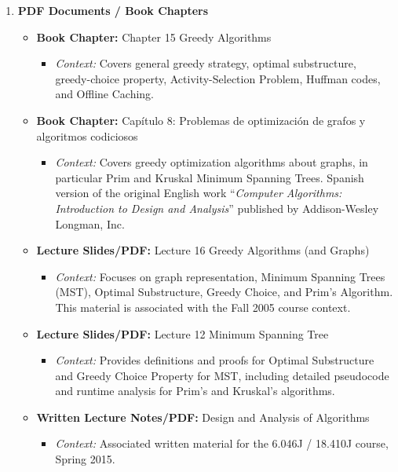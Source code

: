 \documentclass{article}
\begin{document}
\begin{enumerate}
    \item \textbf{PDF Documents / Book Chapters}
    \begin{itemize}
        \item \textbf{Book Chapter\cite{cormen2022algorithms}:} Chapter 15 Greedy Algorithms
        \begin{itemize}
            \item \emph{Context:} Covers general greedy strategy, optimal substructure, greedy-choice property, Activity-Selection Problem, Huffman codes, and Offline Caching.
        \end{itemize}
        \item \textbf{Book Chapter\cite{baase2002algoritmos}:} Capítulo 8: Problemas de optimización de grafos y algoritmos codiciosos
        \begin{itemize}
            \item \emph{Context:} Covers greedy optimization algorithms about graphs, in particular Prim and Kruskal Minimum Spanning Trees.  Spanish version of the original English work ``\textit{Computer Algorithms: Introduction to Design and Analysis}'' published by Addison-Wesley Longman, Inc.
        \end{itemize}


        \item \textbf{Lecture Slides/PDF\cite{leiserson2005greedy}:} Lecture 16 Greedy Algorithms (and Graphs)
        \begin{itemize}
            \item \emph{Context:} Focuses on graph representation, Minimum Spanning Trees (MST), Optimal Substructure, Greedy Choice, and Prim’s Algorithm. This material is associated with the Fall 2005 course context.
        \end{itemize}
        \item \textbf{Lecture Slides/PDF\cite{demaine2015greedy}:} Lecture 12 Minimum Spanning Tree
        \begin{itemize}
            \item \emph{Context:} Provides definitions and proofs for Optimal Substructure and Greedy Choice Property for MST, including detailed pseudocode and runtime analysis for Prim’s and Kruskal’s algorithms.
        \end{itemize}
        \item \textbf{Written Lecture Notes/PDF:} Design and Analysis of Algorithms
        \begin{itemize}
            \item \emph{Context:} Associated written material for the 6.046J / 18.410J course, Spring 2015.
        \end{itemize}
    \end{itemize}


\end{enumerate}
\end{document}
